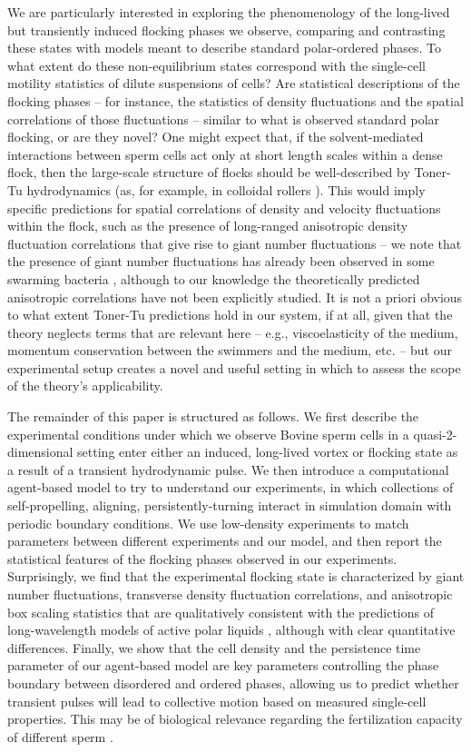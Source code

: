 \documentclass[reprint,unsortedaddress,amsmath,amssymb,aps,pre]{revtex4-2}
\begin{document}
We are particularly interested in exploring the phenomenology of the long-lived but transiently induced flocking phases we observe, comparing and contrasting these states with models meant to describe standard polar-ordered phases. To what extent do these non-equilibrium states correspond with the single-cell motility statistics of dilute suspensions of cells? Are statistical descriptions of the flocking phases -- for instance, the statistics of density fluctuations and the spatial correlations of those fluctuations -- similar to what is observed standard polar flocking, or are they novel? One might expect that, if the solvent-mediated interactions between sperm cells act only at short length scales within a dense flock,  then the large-scale structure of flocks should be well-described by Toner-Tu hydrodynamics (as, for example, in colloidal rollers \cite{2018_Geyer}). This would imply specific predictions for spatial correlations of density and velocity fluctuations within the flock, such as the presence of long-ranged anisotropic density fluctuation correlations that give rise to giant number fluctuations \cite{toner2019giant} -- we note that the presence of giant number fluctuations has already been observed in some swarming bacteria \cite{zhang2010collective}, although to our knowledge the theoretically predicted anisotropic correlations have not been explicitly studied. It is not a priori obvious to what extent Toner-Tu predictions hold in our system, if at all, given that the theory neglects terms that are relevant here -- e.g., viscoelasticity of the medium, momentum conservation between the swimmers and the medium, etc. -- but our experimental setup creates a novel and useful setting in which to assess the scope of the theory's applicability.


The remainder of this paper is structured as follows. We first describe the experimental conditions under which we observe Bovine sperm cells in a quasi-2-dimensional setting enter either an induced, long-lived vortex or flocking state as a result of a transient hydrodynamic pulse. We then introduce a computational agent-based model to try to understand our experiments, in which collections of self-propelling, aligning, persistently-turning interact in simulation domain with periodic boundary conditions. We use low-density experiments to match parameters between different experiments and our model, and then report the statistical features of the flocking phases observed in our experiments. Surprisingly, we find that the experimental flocking state is characterized by giant number fluctuations, transverse density fluctuation correlations, and anisotropic box scaling statistics that are qualitatively consistent with the predictions of long-wavelength models of active polar liquids \cite{toner2019giant}, although with clear quantitative differences. Finally, we show that the cell density and the persistence time parameter of our agent-based model are key parameters controlling the phase boundary between disordered and ordered phases, allowing us to predict whether transient pulses will lead to collective motion based on measured single-cell properties. This may be of biological relevance regarding the fertilization capacity of different sperm \cite{schoeller2020collective}.
\end{document}
